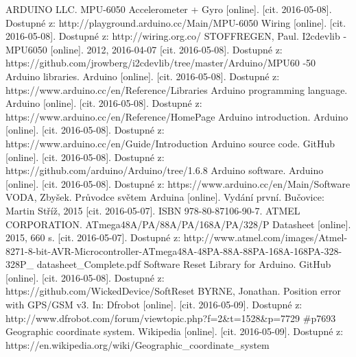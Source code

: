 \documentclass[FM,BP]{tulthesis}  %
\begin{document}
\begin{thebibliography}{References}
ARDUINO LLC. MPU-6050 Accelerometer + Gyro [online]. [cit. 2016-05-08]. Dostupné z: http://playground.arduino.cc/Main/MPU-6050
Wiring [online]. [cit. 2016-05-08]. Dostupné z: http://wiring.org.co/
STOFFREGEN, Paul. I2cdevlib - MPU6050 [online]. 2012, 2016-04-07 [cit. 2016-05-08]. Dostupné z: https://github.com/jrowberg/i2cdevlib/tree/master/Arduino/MPU60 -50
Arduino libraries. Arduino [online]. [cit. 2016-05-08]. Dostupné z: https://www.arduino.cc/en/Reference/Libraries
Arduino programming language. Arduino [online]. [cit. 2016-05-08]. Dostupné z: https://www.arduino.cc/en/Reference/HomePage
Arduino introduction. Arduino [online]. [cit. 2016-05-08]. Dostupné z: https://www.arduino.cc/en/Guide/Introduction
Arduino source code. GitHub [online]. [cit. 2016-05-08]. Dostupné z: https://github.com/arduino/Arduino/tree/1.6.8
 Arduino software. Arduino [online]. [cit. 2016-05-08]. Dostupné z: https://www.arduino.cc/en/Main/Software
VODA, Zbyšek. Průvodce světem Arduina [online]. Vydání první. Bučovice: Martin Stříž, 2015 [cit. 2016-05-07]. ISBN 978-80-87106-90-7.
ATMEL CORPORATION. ATmega48A/PA/88A/PA/168A/PA/328/P Datasheet [online]. 2015, 660 s. [cit. 2016-05-07]. Dostupné z: http://www.atmel.com/images/Atmel-8271-8-bit-AVR-Microcontroller-ATmega48A-48PA-88A-88PA-168A-168PA-328-328P\_ datasheet\_Complete.pdf
Software Reset Library for Arduino. GitHub [online]. [cit. 2016-05-08]. Dostupné z: https://github.com/WickedDevice/SoftReset
BYRNE, Jonathan. Position error with GPS/GSM v3. In: Dfrobot [online]. [cit. 2016-05-09]. Dostupné z: http://www.dfrobot.com/forum/viewtopic.php?f=2\&t=1528\&p=7729 \#p7693
Geographic coordinate system. Wikipedia [online]. [cit. 2016-05-09]. Dostupné z: https://en.wikipedia.org/wiki/Geographic\_coordinate\_system

\end{thebibliography}
\end{document}
